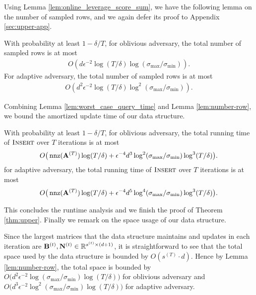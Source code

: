 Using Lemma \ref{lem:online_leverage_score_sum}, we have the following lemma on the number of sampled rows, and we again defer its proof to Appendix \ref{sec:upper-app}.
\begin{lemma}
\label{lem:number-row}
With probability at least $1 -\delta/T$, for oblivious adversary, the total number of sampled rows is at most
\begin{align}
O\left(d\epsilon^{-2} \log(T / \delta) \log(\sigma_{\max}/\sigma_{\min}) \right). \label{eq:number-row-oblivious}
\end{align}
For adaptive adversary, the total number of sampled rows is at most
\begin{align}
O\left(d^2 \epsilon^{-2} \log(T/\delta)\log^2(\sigma_{\max}/\sigma_{\min})\right). \label{eq:number-row-adaptive}
\end{align}
\end{lemma}



Combining Lemma \ref{lem:worst_case_query_time} and Lemma \ref{lem:number-row}, we bound the amortized update time of our data structure.
\begin{lemma}\label{lem:amortized_query_time}
With probability at least $1-\delta/T$, for oblivious adversary, 
the total running time of $\textsc{Insert}$ over $T$ iterations is at most
\[
O\big(\operatorname{nnz}(\mathbf{A}^{(T)}) \log(T/\delta) + \epsilon^{-4} d^3 \log^2(\sigma_{\max} / \sigma_{\min}) \log^3(T / \delta)\big).
\]
for adaptive adversary, 
the total running time of $\textsc{Insert}$ over $T$ iterations is at most
\[
O\big(\operatorname{nnz}(\mathbf{A}^{(T)}) \log(T/\delta) + \epsilon^{-4} d^5 \log^4(\sigma_{\max} / \sigma_{\min}) \log^3(T / \delta)\big).
\]
\end{lemma}


This concludes the runtime analysis and we finish the proof of Theorem \ref{thm:upper}. Finally we remark on the space usage of our data structure.





\begin{remark}\label{rem:space}
Since the largest matrices that the data structure maintains and updates in each iteration are $\mathbf{B}^{(t)}, \mathbf{N}^{(t)} \in \mathbb{R}^{s^{(t)} \times (d+1)}$, it is straightforward to see that the total space used by the data structure is bounded by $O(s^{(T)} \cdot d)$. Hence by Lemma \ref{lem:number-row}, the total space is bounded by $O\big(d^2 \epsilon^{-2}  \log(\sigma_{\max} / \sigma_{\min}) \log(T / \delta) \big)$ for oblivious adversary and $O\big(d^3 \epsilon^{-2}  \log^2(\sigma_{\max} / \sigma_{\min}) \log(T / \delta) \big)$ for adaptive adversary.

\end{remark}







